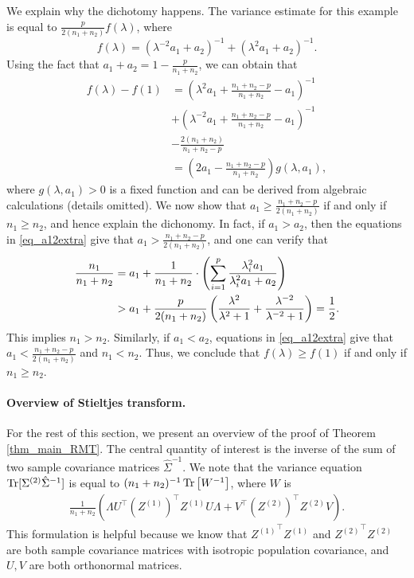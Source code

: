 We explain why the dichotomy happens. The variance estimate for this example is equal to
$\frac{p}{2(n_1 + n_2)} f(\lambda)$, where
\[ f(\lambda) = {(\lambda^{-2} a_1 + a_2)^{-1} + (\lambda^2 a_1 + a_2)^{-1}}. \]
Using the fact that $a_1 + a_2 = 1 - \frac{p}{n_1 + n_2 }$, we can obtain that
\begin{align*}
	f(\lambda) - f(1) &= \left(\lambda^2 a_1 + \frac{n_1 + n_2 - p}{n_1 + n_2} - a_1\right)^{-1} \\
	&+ \left(\lambda^{-2} a_1 + \frac{n_1 + n_2 - p}{n_1 + n_2} - a_1\right)^{-1} \\
	&- \frac{2(n_1 + n_2)}{n_1 + n_2 - p} \\
	&= \left(2a_1 - \frac{n_1 + n_2-p} {n_1 + n_2 }\right)  g(\lambda, a_1), %
\end{align*}
where $g(\lambda, a_1) > 0$ is a fixed function and can be derived from algebraic calculations (details omitted).
We now show that $a_1 \ge \frac{n_1 + n_2-p}{2(n_1 + n_2 )}$ if and only if $n_1 \ge n_2$, and hence explain the dichonomy.
In fact, if $a_1>a_2$, then the equations in \eqref{eq_a12extra} give that $a_1> \frac{n_1 + n_2-p}{2 (n_1 + n_2)}$, and one can verify that
\begin{align*}
 \frac{n_1}{n_1 + n_2} &=a_1 + \frac1{n_1 + n_2}\cdot \left({\sum_{i=1}^p \frac{\lambda_i^2 a_1}{\lambda_i^2 a_1 + a_2}}\right) \\
	&> a_1 + \frac{p}{2(n_1+n_2)} \left(\frac{\lambda^2}{\lambda^2+1}+\frac{\lambda^{-2}}{\lambda^{-2}+1}\right) =\frac{1}{2}.
\end{align*}
This implies $n_1>n_2$. Similarly, if $a_1<a_2$, equations in \eqref{eq_a12extra} give that $a_1 < \frac{n_1 + n_2-p}{2 (n_1 + n_2)}$ and $n_1<n_2$. Thus, we conclude that $f(\lambda) \ge f(1)$ if and only if $n_1 \ge n_2$. 

\paragraph{Overview of Stieltjes transform.}
For the rest of this section, we present an overview of the proof of Theorem \ref{thm_main_RMT}.
The central quantity of interest is the inverse of the sum of two sample covariance matrices $\hat{\Sigma}^{-1}$.
We note that the variance equation $\operatorname{Tr}[\Sigma^{(2)} \hat{\Sigma}^{-1}]$ is equal to $(n_1 + n_2)^{-1} \operatorname{Tr}\left[W^{-1}\right]$, where $W$ is
\begin{align}\label{eigen2extra}
	\frac{1}{n_1 + n_2}(\Lambda U^\top (Z^{(1)})^\top Z^{(1)} U\Lambda  + V^\top (Z^{(2)})^\top Z^{(2)}V).
\end{align}
This formulation is helpful because we know that ${Z^{(1)}}^{\top} Z^{(1)}$ and ${Z^{(2)}}^{\top} Z^{(2)}$ are both sample covariance matrices with isotropic population covariance, and $U, V$ are both orthonormal matrices.

